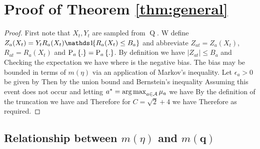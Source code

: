 \section{Proof of Theorem \ref{thm:general}}\label{sec:thm:general}

\begin{proof}
First note that $X_t, Y_t$ are sampled from $\operatorname{Q}$.
W define $Z_a(X_t) = Y_t R_a(X_t)\ind{R_a(X_t)\leq B_a}$ and abbreviate $Z_{at} = Z_a(X_t)$, $R_{at} = R_a(X_t)$ and $\operatorname{P}_{a}\left\{.\right\} = \operatorname{P}_{a}\left\{.\right\}$.
By definition we have $|Z_{at}| \leq B_a$ and 
Checking the expectation we have
where 
is the negative bias. 
The bias may be bounded in terms of $m(\eta)$ via an application of Markov's inequality.
Let $\epsilon_a > 0$ be given by
Then by the union bound and Bernstein's inequality 
Assuming this event does not occur and letting $a^* = \argmax_{a \in \calA} \mu_a$ we have
By the definition of the truncation
we have
and
Therefore for $C = \sqrt{2} + 4$ we have
Therefore
as required.
\end{proof}

\subsection{Relationship between $m(\eta)$ and $m(\boldsymbol{q})$}\label{sec:m-equivelence}

